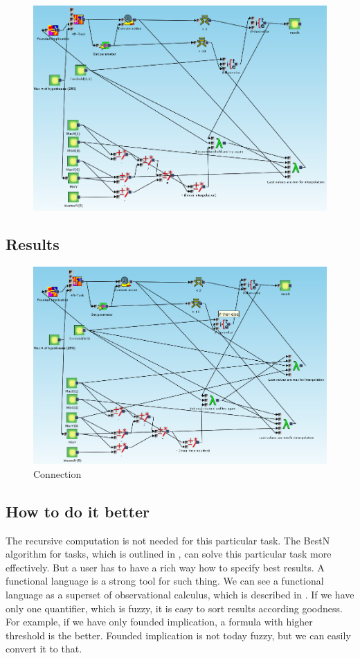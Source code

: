 \documentclass[a4paper,12pt]{book}
\begin{document}
\begin{figure}
	\includegraphics[width=1\textwidth]{exampleWithoutInterpolationOnMax}
\end{figure}

\subsection{Results}
\begin{figure}
	\includegraphics[width=1\textwidth]{exampleResult}
	\caption{Connection}
\end{figure}


\subsection{How to do it better}
The recursive computation is not needed for this particular task. The BestN algorithm for tasks, which is outlined in \cite{thesisKuchar}, can solve this particular task more effectively. But a user has to have a rich way how to specify best results. A functional language is a strong tool for such thing. We can see a functional language as a superset of observational calculus, which is described in \cite{GUHAbook}. If we have only one quantifier, which is fuzzy, it is easy to sort results according goodness. For example, if we have only founded implication, a formula with higher threshold is the better. Founded implication is not today fuzzy, but we can easily convert it to that.
\end{document}
